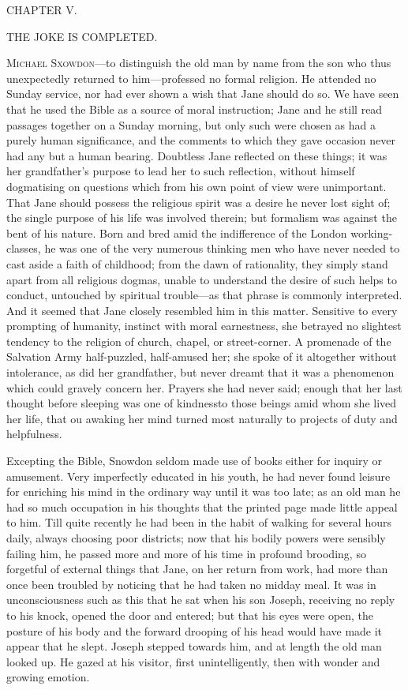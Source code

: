 {}

{CHAPTER V.}

THE JOKE IS COMPLETED.

\textsc{Michael Sxowdon}---to distinguish the old man by name from the
son who thus unexpectedly returned to him---professed no formal
religion. He attended no Sunday service, nor had ever shown a wish that
Jane should do so. We have seen that he used the Bible as a source of
moral instruction; Jane and he still read passages together on a Sunday
morning, but only such were chosen as had a purely human significance,
and the comments to which they gave occasion never had any but a human
bearing. Doubtless Jane reflected on these things; it was her
grandfather's purpose to lead her to such reflection, without himself
dogmatising on questions which from his own point of view were
unimportant. That Jane should possess the {}religious spirit was a
desire he never lost sight of; the single purpose of his life was
involved therein; but formalism was against the bent of his nature. Born
and bred amid the indifference of the London working-classes, he was one
of the very numerous thinking men who have never needed to cast aside a
faith of childhood; from the dawn of rationality, they simply stand
apart from all religious dogmas, unable to understand the desire of such
helps to conduct, untouched by spiritual trouble---as that phrase is
commonly interpreted. And it seemed that Jane closely resembled him in
this matter. Sensitive to every prompting of humanity, instinct with
moral earnestness, she betrayed no slightest tendency to the religion of
church, chapel, or street-corner. A promenade of the Salvation Army
half-puzzled, half-amused her; she spoke of it altogether without
intolerance, as did her grandfather, but never dreamt that it was a
phenomenon which could gravely concern her. Prayers she had never said;
enough that her last thought before sleeping was one of {}kindnessto
those beings amid whom she lived her life, that ou awaking her mind
turned most naturally to projects of duty and helpfulness.

Excepting the Bible, Snowdon seldom made use of books either for inquiry
or amusement. Very imperfectly educated in his youth, he had never found
leisure for enriching his mind in the ordinary way until it was too
late; as an old man he had so much occupation in his thoughts that the
printed page made little appeal to him. Till quite recently he had been
in the habit of walking for several hours daily, always choosing poor
districts; now that his bodily powers were sensibly failing him, he
passed more and more of his time in profound brooding, so forgetful of
external things that Jane, on her return from work, had more than once
been troubled by noticing that he had taken no midday meal. It was in
unconsciousness such as this that he sat when his son Joseph, receiving
no reply to his knock, opened the door and entered; but that his eyes
were open, the {}posture of his body and the forward drooping of his
head would have made it appear that he slept. Joseph stepped towards
him, and at length the old man looked up. He gazed at his visitor, first
unintelligently, then with wonder and growing emotion.

